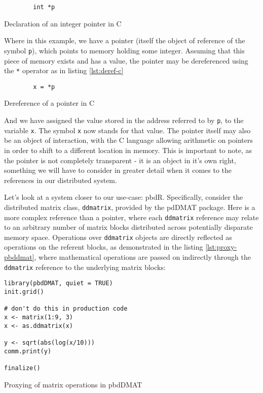 \begin{listing}
    \begin{verbatim}
        int *p
    \end{verbatim}
    \caption{Declaration of an integer pointer in C}
    \label{lst:declare-int-pointer}
\end{listing}

Where in this example, we have a pointer (itself the object of reference
of the symbol \texttt{p}), which points to memory holding some integer.
Assuming that this piece of memory exists and has a value, the pointer
may be dereferenced using the \texttt{*} operator as in listing \cref{lst:deref-c}

\begin{listing}
    \begin{verbatim}
        x = *p
    \end{verbatim}
    \caption{Dereference of a pointer in C}
    \label{lst:deref-c}
\end{listing}

And we have assigned the value stored in the address referred to by
\texttt{p}, to the variable \texttt{x}. The symbol \texttt{x} now stands
for that value. The pointer itself may also be an object of interaction,
with the C language allowing arithmetic on pointers in order to shift to
a different location in memory. This is important to note, as the
pointer is not completely transparent - it is an object in it's own
right, something we will have to consider in greater detail when it
comes to the references in our distributed system.

Let's look at a system closer to our use-case: pbdR. Specifically,
consider the distributed matrix class, \texttt{ddmatrix}, provided by
the pdDMAT package. Here is a more complex reference than a pointer,
where each \texttt{ddmatrix} reference may relate to an arbitrary number
of matrix blocks distributed across potentially disparate memory space.
Operations over \texttt{ddmatrix} objects are directly reflected as
operations on the referent blocks, as demonstrated in the listing \cref{lst:proxy-pbddmat},
where mathematical operations are passed on indirectly through
the \texttt{ddmatrix} reference to the underlying matrix blocks:

\begin{listing}
    \begin{verbatim}
library(pbdDMAT, quiet = TRUE)
init.grid()

# don't do this in production code
x <- matrix(1:9, 3)
x <- as.ddmatrix(x)

y <- sqrt(abs(log(x/10)))
comm.print(y)

finalize()
    \end{verbatim}
    \caption{Proxying of matrix operations in pbdDMAT}
    \label{lst:proxy-pbddmat}
\end{listing}

